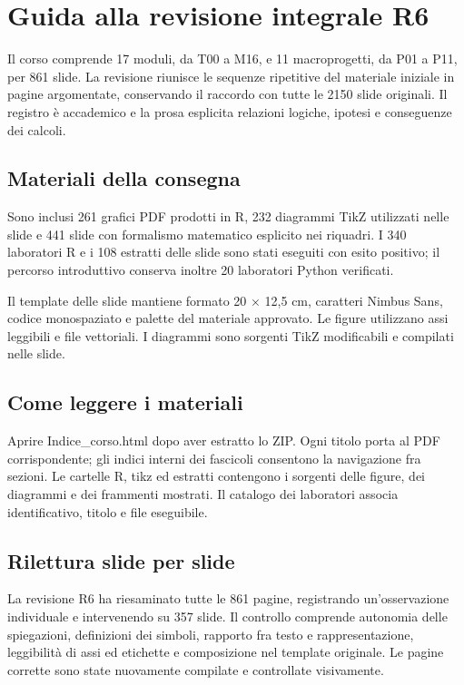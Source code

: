 \documentclass[11pt,a4paper]{article}
\begin{document}
\section*{Guida alla revisione integrale R6}

Il corso comprende 17 moduli, da T00 a M16, e 11 macroprogetti, da P01 a P11, per 861 slide. La revisione riunisce le sequenze ripetitive del materiale iniziale in pagine argomentate, conservando il raccordo con tutte le 2150 slide originali. Il registro è accademico e la prosa esplicita relazioni logiche, ipotesi e conseguenze dei calcoli.

\subsection*{Materiali della consegna}

Sono inclusi 261 grafici PDF prodotti in R, 232 diagrammi TikZ utilizzati nelle slide e 441 slide con formalismo matematico esplicito nei riquadri. I 340 laboratori R e i 108 estratti delle slide sono stati eseguiti con esito positivo; il percorso introduttivo conserva inoltre 20 laboratori Python verificati.

Il template delle slide mantiene formato 20 × 12,5 cm, caratteri Nimbus Sans, codice monospaziato e palette del materiale approvato. Le figure utilizzano assi leggibili e file vettoriali. I diagrammi sono sorgenti TikZ modificabili e compilati nelle slide.

\subsection*{Come leggere i materiali}

Aprire Indice\_corso.html dopo aver estratto lo ZIP. Ogni titolo porta al PDF corrispondente; gli indici interni dei fascicoli consentono la navigazione fra sezioni. Le cartelle R, tikz ed estratti contengono i sorgenti delle figure, dei diagrammi e dei frammenti mostrati. Il catalogo dei laboratori associa identificativo, titolo e file eseguibile.

\subsection*{Rilettura slide per slide}

La revisione R6 ha riesaminato tutte le 861 pagine, registrando un’osservazione individuale e intervenendo su 357 slide. Il controllo comprende autonomia delle spiegazioni, definizioni dei simboli, rapporto fra testo e rappresentazione, leggibilità di assi ed etichette e composizione nel template originale. Le pagine corrette sono state nuovamente compilate e controllate visivamente.
\end{document}
